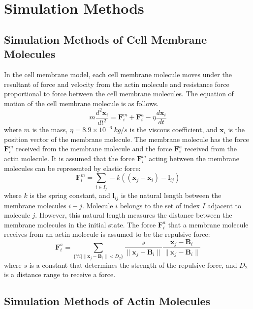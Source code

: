 \documentclass[a4paper,12pt]{book}
\begin{document}
\chapter{Simulation Methods}
\section{Simulation Methods of Cell Membrane Molecules}
In the cell membrane model, each cell membrane molecule moves under the resultant of force and velocity from the actin molecule and resistance force proportional to force between the cell membrane molecules. The equation of motion of the cell membrane molecule is as follows.
\begin{equation}
m\frac{d^2\bm{x}_i}{dt^2} = \bm{F}^m_i +  \bm{F}^a_i - \eta \frac{d\bm{x}_i}{dt}
\end{equation}
where  $m$ is the mass, $\eta = 8.9\times10^{-6}\si{~kg/s}$ is the viscous coefficient, and $\bm{x}_i$ is the position vector of the membrane molecule. The membrane molecule has the force  $\bm{F}^m_i$ received from the membrane molecule and the force  $\bm{F}^a_i$ received from the actin molecule. It is assumed that the force  $\bm{F}^m_i$ acting between the membrane molecules can be represented by elastic force:
\begin{equation}
\bm{F}^m_i = \sum_{i \in I_j}  -k((\bm{x}_j -\bm{x}_i )-\bm{l}_{ij} )
\end{equation}
where $k$ is the spring constant, and $\bm{l}_{ij}$ is the natural length between the membrane molecules $i-j$. Molecule  $i$ belongs to the set of index $I$ adjacent to molecule $j$. However, this natural length measures the distance between the membrane molecules in the initial state. The force  $\bm{F}^a_i$ that a membrane molecule receives from an actin molecule is assumed to be the repulsive force:
\begin{equation}
\bm{F}^a_i = \sum_{\{ \forall i | \| \bm{x}_j - \bm{B}_i \|<D_2\}} \frac{s}{\|\bm{x}_j -\bm{B}_i \|} \frac{\bm{x}_j -\bm{B}_i }{\|\bm{x}_j -\bm{B}_i \|}
\end{equation}
where $s$ is a constant that determines the strength of the repulsive force, and $D_2$ is a distance range to receive a force.


\section{Simulation Methods of Actin Molecules}
\end{document}
